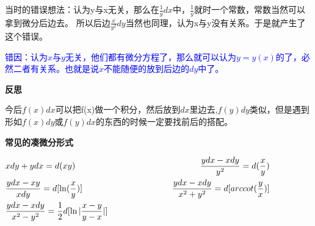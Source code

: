 \documentclass[fontset=windows]{article}
\begin{document}
    当时的错误想法：认为y与x无关，那么在$\frac{1}{y}dx$中，$\frac{1}{y}$就时一个常数，常数当然可以拿到微分后边去。
    所以后边$\frac{x}{y^2}dy$当然也同理，认为x与y没有关系。于是就产生了这个错误。

    \textcolor{blue}{错因：认为$x$与$y$无关，他们都有微分方程了，那么就可以认为$y=y(x)$的了，必然二者有关系。也就是说$x$不能随便的放到后边的$dy$中了。}

    \textbf{反思}

    今后$f(x)dx$可以把f(x)做一个积分，然后放到$dx$里边去,$f(y)dy$类似，但是遇到形如$f(x)dy \text{或}f(y)dx$的东西的时候一定要找前后的搭配。

    \textbf{常见的凑微分形式}

    \begin{tcolorbox}[colback=blue!5!white,colframe=blue!75!black,title=常见的凑微分形式]
    \noindent
    $
        \begin{aligned}
            &xdy + ydx = d(xy) \hspace*{0.3\linewidth}  & \frac{ydx-xdy}{y^2}=d(\frac{x}{y})\nonumber \\
            &\frac{ydx -xy}{xdy}=d[\ln(\frac{x}{y})] & \frac{ydx-xdy}{x^2+y^2}=d[arccot(\frac{y}{x})]\nonumber\\
            &\frac{ydx-xdy}{x^2-y^2}=\frac{1}{2}d[\ln|\frac{x-y}{y-x}|]&~~\nonumber
        \end{aligned}  
    $
      
    \end{tcolorbox}
    
\end{document}
